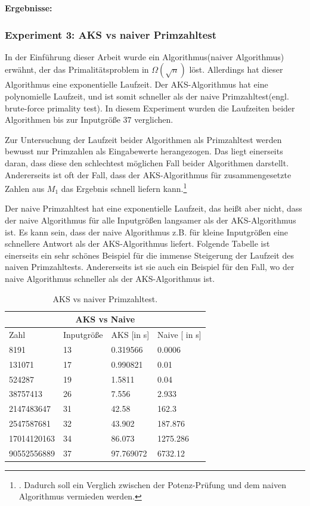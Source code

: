 \documentclass[12pt,oneside]{article}
\theoremstyle{remark}
\theoremstyle{definition}
\begin{document}
\textbf{\small{Ergebnisse:}}



\subsubsection{Experiment 3: AKS vs naiver Primzahltest}
In der Einführung dieser Arbeit wurde ein Algorithmus(naiver Algorithmus) erwähnt, der das Primalitätsproblem in $\Omega(\sqrt{n})$ löst. Allerdings hat dieser Algorithmus eine exponentielle Laufzeit. Der AKS-Algorithmus hat eine polynomielle Laufzeit, und ist somit schneller als der naive Primzahltest(engl. brute-force primality test). In diesem Experiment wurden die Laufzeiten beider Algorithmen bis zur Inputgröße $37$ verglichen.  

Zur Untersuchung der Laufzeit beider Algorithmen als Primzahltest werden bewusst nur Primzahlen als Eingabewerte herangezogen. Das liegt einerseits daran, dass diese den schlechtest möglichen Fall beider Algorithmen darstellt. Andererseits ist oft der Fall, dass der AKS-Algorithmus für zusammengesetzte Zahlen aus $M_1$ das Ergebnis  schnell liefern kann.\footnote{. Dadurch soll ein Verglich zwischen der Potenz-Prüfung und dem naiven Algorithmus vermieden werden.}\newline

Der naive Primzahltest hat eine exponentielle Laufzeit, das heißt aber nicht, dass der naive Algorithmus für alle Inputgrößen langsamer als der AKS-Algorithmus ist. Es kann sein, dass der naive Algorithmus z.B. für kleine Inputgrößen eine schnellere Antwort als der AKS-Algorithmus liefert. Folgende Tabelle ist einerseits ein sehr schönes Beispiel für die immense Steigerung der Laufzeit des naiven Primzahltests. Andererseits ist sie auch ein Beispiel für den Fall, wo der naive Algorithmus schneller als der AKS-Algorithmus ist. 
\begin{table}[h!]
\centering
\begin{tabular}{ |p{3cm}||p{3cm}|p{3cm}|p{3cm}|  }
 \hline
 \multicolumn{4}{|c|}{AKS vs Naive} \\
 \hline
 Zahl & Inputgröße  & AKS [in s] &Naive [ in s]\\
 \hline
 8191   & 13    &0.319566&   0.0006\\
 131071&   17  & 0.990821   &0.01\\
 524287 &19 &  1.5811& 0.04\\
 38757413    &26 & 7.556&   2.933\\
 2147483647& 31  & 42.58   &162.3\\
 2547587681& 32  &  43.902&  187.876\\
 17014120163&   34  & 86.073& 1275.286\\
 90552556889&   37  & 97.769072& 6732.12\\

 \hline
\end{tabular}
 \caption{AKS vs naiver Primzahltest.}
\label{table:4}
\end{table}
\end{document}
